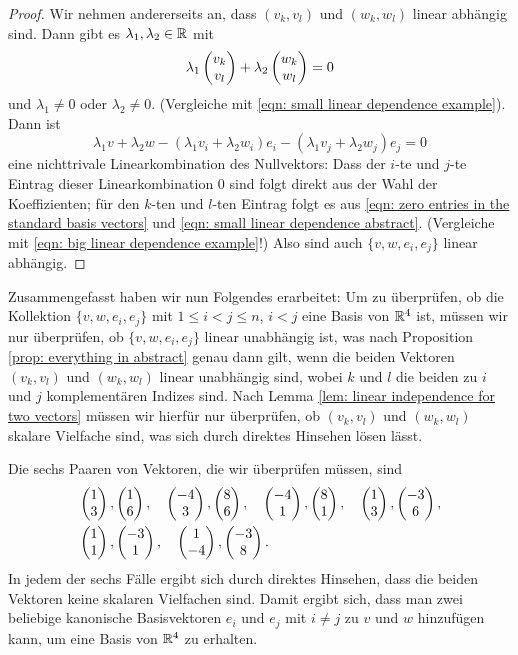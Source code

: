 \documentclass[a4paper,10pt]{article}
\begin{document}
\begin{proof}
 Wir nehmen andererseits an, dass $(v_k, v_l)$ und $(w_k, w_l)$ linear abhängig sind. Dann gibt es $\lambda_1, \lambda_2 \in \mathbb{R}$ mit
 \begin{equation}\label{eqn: small linear dependence abstract}
  \lambda_1 \begin{pmatrix}v_k \\ v_l\end{pmatrix} + \lambda_2 \begin{pmatrix}w_k \\ w_l\end{pmatrix} = 0
 \end{equation}
 und $\lambda_1 \neq 0$ oder $\lambda_2 \neq 0$. (Vergleiche mit \eqref{eqn: small linear dependence example}). Dann ist
 \begin{equation}\label{eqn: big linear dependence abstract}
  \lambda_1 v + \lambda_2 w - (\lambda_1 v_i + \lambda_2 w_i) e_i - (\lambda_1 v_j +  \lambda_2 w_j) e_j = 0
 \end{equation}
 eine nichttrivale Linearkombination des Nullvektors: Dass der $i$-te und $j$-te Eintrag dieser Linearkombination $0$ sind folgt direkt aus der Wahl der Koeffizienten; für den $k$-ten und $l$-ten Eintrag folgt es aus \eqref{eqn: zero entries in the standard basis vectors} und \eqref{eqn: small linear dependence abstract}. (Vergleiche mit \eqref{eqn: big linear dependence example}!) Also sind auch $\{v,w,e_i,e_j\}$ linear abhängig.
\end{proof}


Zusammengefasst haben wir nun Folgendes erarbeitet: Um zu überprüfen, ob die Kollektion $\{v,w,e_i,e_j\}$ mit $1 \leq i < j \leq n$, $i < j$ eine Basis von $\mathbb{R}^4$ ist, müssen wir nur überprüfen, ob $\{v,w,e_i,e_j\}$ linear unabhängig ist, was nach Proposition \ref{prop: everything in abstract} genau dann gilt, wenn die beiden Vektoren $(v_k, v_l)$ und $(w_k, w_l)$ linear unabhängig sind, wobei $k$ und $l$ die beiden zu $i$ und $j$ komplementären Indizes sind. Nach Lemma \ref{lem: linear independence for two vectors} müssen wir hierfür nur überprüfen, ob $(v_k, v_l)$ und $(w_k, w_l)$ skalare Vielfache sind, was sich durch direktes Hinsehen lösen lässt.

Die sechs Paaren von Vektoren, die wir überprüfen müssen, sind
\begin{align*}
 &\begin{pmatrix}1 \\ 3\end{pmatrix}, \begin{pmatrix}1 \\ 6\end{pmatrix}, \quad
  \begin{pmatrix}-4 \\ 3\end{pmatrix}, \begin{pmatrix}8 \\ 6\end{pmatrix}, \quad
  \begin{pmatrix}-4 \\ 1\end{pmatrix}, \begin{pmatrix}8 \\ 1\end{pmatrix}, \quad
  \begin{pmatrix}1 \\ 3\end{pmatrix}, \begin{pmatrix}-3 \\ 6\end{pmatrix}, \\
 &\begin{pmatrix}1 \\ 1\end{pmatrix}, \begin{pmatrix}-3 \\ 1\end{pmatrix}, \quad
  \begin{pmatrix}1 \\ -4\end{pmatrix}, \begin{pmatrix}-3 \\ 8\end{pmatrix}.
\end{align*}
In jedem der sechs Fälle ergibt sich durch direktes Hinsehen, dass die beiden Vektoren keine skalaren Vielfachen sind. Damit ergibt sich, dass man zwei beliebige kanonische Basisvektoren $e_i$ und $e_j$ mit $i \neq j$ zu $v$ und $w$ hinzufügen kann, um eine Basis von $\mathbb{R}^4$ zu erhalten.
\end{document}
